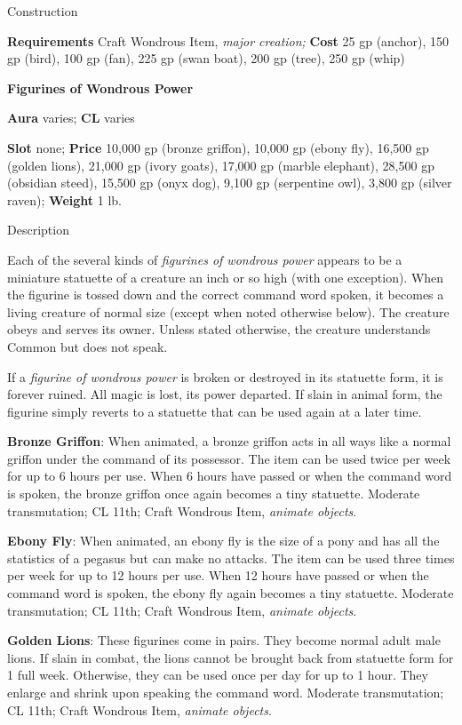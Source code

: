 Construction
				
\textbf{Requirements} Craft Wondrous Item, \textit{major creation;}\textbf{ Cost }25 gp (anchor), 150 gp (bird), 100 gp (fan), 225 gp (swan boat), 200 gp (tree), 250 gp (whip)
				
\textbf{Figurines of Wondrous Power}
				
\textbf{Aura} varies;\textbf{ CL }varies
				
\textbf{Slot} none; \textbf{Price} 10,000 gp (bronze griffon), 10,000 gp (ebony fly), 16,500 gp (golden lions), 21,000 gp (ivory goats), 17,000 gp (marble elephant), 28,500 gp (obsidian steed), 15,500 gp (onyx dog), 9,100 gp (serpentine owl), 3,800 gp (silver raven); \textbf{Weight }1 lb.
				
Description
				
Each of the several kinds of \textit{figurines of wondrous power} appears to be a miniature statuette of a creature an inch or so high (with one exception). When the figurine is tossed down and the correct command word spoken, it becomes a living creature of normal size (except when noted otherwise below). The creature obeys and serves its owner. Unless stated otherwise, the creature understands Common but does not speak.
				
If a \textit{figurine of wondrous power }is broken or destroyed in its statuette form, it is forever ruined. All magic is lost, its power departed. If slain in animal form, the figurine simply reverts to a statuette that can be used again at a later time.
				
\textbf{Bronze Griffon}: When animated, a bronze griffon acts in all ways like a normal griffon under the command of its possessor. The item can be used twice per week for up to 6 hours per use. When 6 hours have passed or when the command word is spoken, the bronze griffon once again becomes a tiny statuette. Moderate transmutation; CL 11th; Craft Wondrous Item,\textit{ animate objects}.
				
\textbf{Ebony Fly}: When animated, an ebony fly is the size of a pony and has all the statistics of a pegasus but can make no attacks. The item can be used three times per week for up to 12 hours per use. When 12 hours have passed or when the command word is spoken, the ebony fly again becomes a tiny statuette. Moderate transmutation; CL 11th; Craft Wondrous Item,\textit{ animate objects}.
				
\textbf{Golden Lions}: These figurines come in pairs. They become normal adult male lions. If slain in combat, the lions cannot be brought back from statuette form for 1 full week. Otherwise, they can be used once per day for up to 1 hour. They enlarge and shrink upon speaking the command word. Moderate transmutation; CL 11th; Craft Wondrous Item,\textit{ animate objects}.
				
